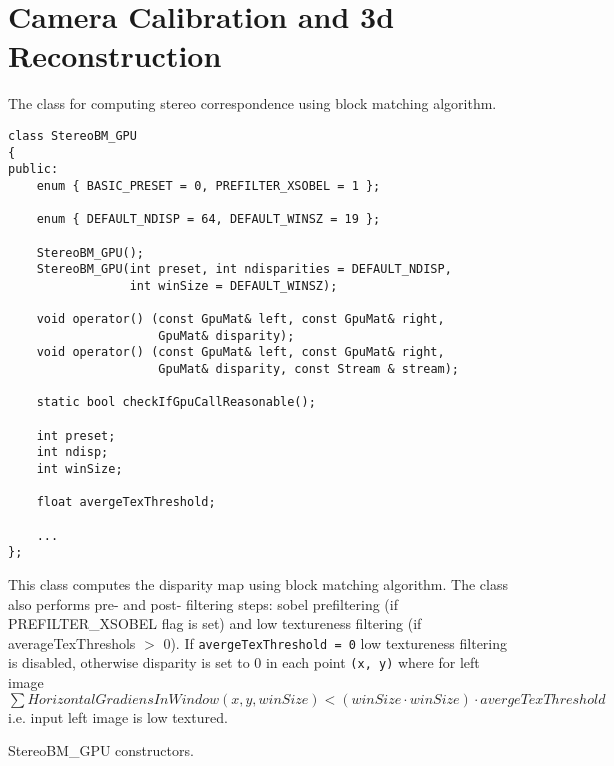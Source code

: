\section{Camera Calibration and 3d Reconstruction}


The class for computing stereo correspondence using block matching algorithm.

\begin{lstlisting}
class StereoBM_GPU
{
public:
    enum { BASIC_PRESET = 0, PREFILTER_XSOBEL = 1 };

    enum { DEFAULT_NDISP = 64, DEFAULT_WINSZ = 19 };

    StereoBM_GPU();
    StereoBM_GPU(int preset, int ndisparities = DEFAULT_NDISP, 
                 int winSize = DEFAULT_WINSZ);

    void operator() (const GpuMat& left, const GpuMat& right, 
                     GpuMat& disparity);
    void operator() (const GpuMat& left, const GpuMat& right, 
                     GpuMat& disparity, const Stream & stream);

    static bool checkIfGpuCallReasonable();

    int preset;
    int ndisp;
    int winSize;

    float avergeTexThreshold;
    
    ...
};
\end{lstlisting}

This class computes the disparity map using block matching algorithm. The class also performs pre- and post- filtering steps: sobel prefiltering (if PREFILTER\_XSOBEL flag is set) and low textureness filtering (if averageTexThreshols $>$ 0). If \texttt{avergeTexThreshold = 0} low textureness filtering is disabled, otherwise disparity is set to 0 in each point \texttt{(x, y)} where for left image $\sum HorizontalGradiensInWindow(x, y, winSize) < (winSize \cdot winSize) \cdot avergeTexThreshold$ i.e. input left image is low textured.


\label{cppfunc.gpu.StereoBM.StereoBM}
StereoBM\_GPU constructors.


\begin{description}
\begin{description}
\end{description}
\end{description}


